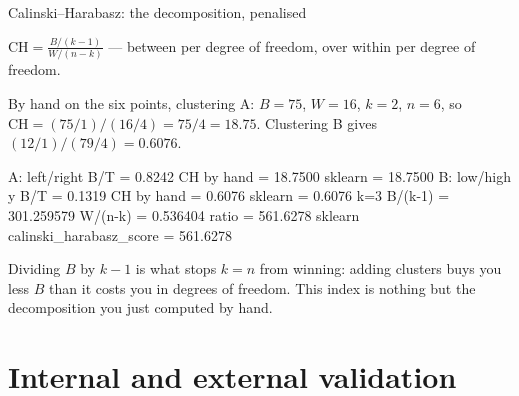 \documentclass[aspectratio=169]{beamer}
\begin{document}
\begin{frame}[fragile,shrink=8]{Calinski--Harabasz: the decomposition, penalised}
  \begin{exampleblock}{}
    \centering\large
    $\displaystyle \mathrm{CH} = \frac{B / (k-1)}{W / (n-k)}$
    \quad --- between per degree of freedom, over within per degree of freedom.
  \end{exampleblock}
  \vspace{0.2em}
  By hand on the six points, clustering A: $B = 75$, $W = 16$, $k = 2$,
  $n = 6$, so $\mathrm{CH} = (75/1)/(16/4) = 75/4 = \mathbf{18.75}$.
  Clustering B gives $(12/1)/(79/4) = \mathbf{0.6076}$.
\begin{outblk}
A: left/right     B/T = 0.8242   CH by hand =  18.7500   sklearn =  18.7500
B: low/high y     B/T = 0.1319   CH by hand =   0.6076   sklearn =   0.6076
k=3  B/(k-1) = 301.259579   W/(n-k) =   0.536404   ratio =  561.6278
     sklearn calinski_harabasz_score = 561.6278
\end{outblk}
  \begin{center}\small
    Dividing $B$ by $k - 1$ is what stops $k = n$ from winning: adding
    clusters buys you less $B$ than it costs you in degrees of freedom. This
    index is nothing but the decomposition you just computed by hand.
  \end{center}
\end{frame}

\section[Validation]{Internal and external validation}
\label{sec:valid}
\end{document}
